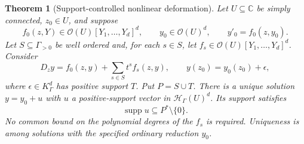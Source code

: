 \documentclass[11pt,letterpaper]{article}
\numberwithin{equation}{section}
\newtheorem{theorem}{Theorem}[section]
\theoremstyle{definition}
\theoremstyle{remark}
\newcommand{\C}{\mathbb C}
\newcommand{\OO}{\mathcal O}
\newcommand{\HH}{\mathscr H}
\newcommand{\supp}{\operatorname{supp}}
\begin{document}
\begin{theorem}[Support-controlled nonlinear deformation]
\label{thm:nonlinear}
Let $U\subseteq\C$ be simply connected, $z_0\in U$, and suppose
\[
 f_0(z,Y)\in\OO(U)[Y_1,\ldots,Y_d]^d,
 \qquad y_0\in\OO(U)^d,
 \qquad y'_0=f_0(z,y_0).
\]
Let $S\subseteq\Gamma_{>0}$ be well ordered and, for each $s\in S$, let
$f_s\in\OO(U)[Y_1,\ldots,Y_d]^d$. Consider
\begin{equation}\label{eq:nonlinear}
 D_zy=f_0(z,y)+\sum_{s\in S}t^sf_s(z,y),
 \qquad y(z_0)=y_0(z_0)+\epsilon,
\end{equation}
where $\epsilon\in K_\Gamma^d$ has positive support $T$.
Put $P=S\cup T$. There is a unique solution $y=y_0+u$ with $u$ a
positive-support vector in $\HH_\Gamma(U)^d$. Its support satisfies
\[
 \supp u\subseteq P^*\setminus\{0\}.
\]
No common bound on the polynomial degrees of the $f_s$ is required.
Uniqueness is among solutions with the specified ordinary reduction $y_0$.
\end{theorem}
\end{document}
